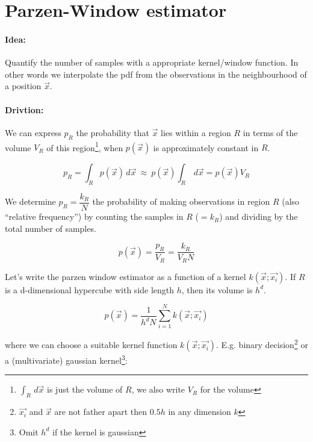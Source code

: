 
\section*{Parzen-Window estimator}
\paragraph{Idea:} Quantify the number of samples with a appropriate kernel/window function. In other words we interpolate
the pdf from the observations in the neighbourhood of a position $\vec{x}$.

\paragraph{Drivtion:} We can express $p_R$ the probability that $\vec{x}$ lies within a region $R$ in terms of the volume $V_R$ of this region\footnote{$\int_R \,d\vec{x}$ is just the volume of $R$, we also write $V_R$ for the volume}, when $p(\vec{x})$ is approximately constant in $R$.

\begin{equation*}
  p_R = \int_R p(\vec{x}) \,d\vec{x} \ \approx \ p(\vec{x}) \int_R \,d\vec{x} = p(\vec{x}) V_R
\end{equation*}

We determine $p_R = \dfrac{k_R}{N}$ the probability of making observations in region $R$ (also ``relative frequency'')  by counting the samples in $R$ ($=k_R$) and dividing by the total number of samples.

\begin{equation*}
  p(\vec{x}) = \dfrac{p_R}{V_R} = \dfrac{k_R}{V_R N}
\end{equation*}

Let's write the parzen window estimator as a function of a kernel $k(\vec{x}; \vec{x_i})$. If $R$ is a d-dimensional hypercube with side length $h$, then its volume is $h^d$.

\begin{equation*}
  \boxed{p(\vec{x}) = \dfrac{1}{h^d N} \sum_{i=1}^N k(\vec{x}; \vec{x_i})}
\end{equation*}

where we can choose a suitable kernel function $k(\vec{x}; \vec{x_i})$. E.g. binary decision\footnote{$\vec{x_i}$ and $\vec{x}$ are not father apart then $0.5 h$ in any dimension $k$} or a (multivariate) gaussian kernel\footnote{Omit $h^d$ if the kernel is gaussian}:

